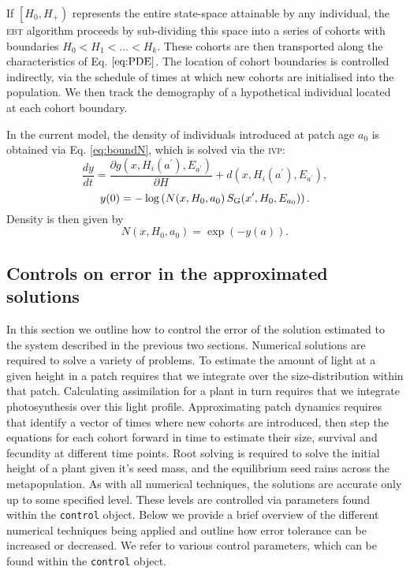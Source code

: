 \documentclass[10pt,twoside]{article}
\begin{document}
If \(\left[H_0, H_{ + } \right)\) represents the entire state-space
attainable by any individual, the \textsc{ebt} algorithm proceeds by sub-dividing
this space into a series of cohorts with boundaries
\(H_0 < H_1 < \ldots < H_k\). These cohorts are then transported along
the characteristics of Eq. \(\ref{eq:PDE}\). The location of cohort
boundaries is controlled indirectly, via the schedule of times at which
new cohorts are initialised into the population. We then track the
demography of a hypothetical individual located at each cohort boundary.

In the current model, the density of individuals introduced at patch age
\(a_0\) is obtained via Eq.
\ref{eq:boundN}, which is solved via the \textsc{ivp}:
\[\frac{dy}{dt} = \frac{\partial g(x, H_i(a^\prime), E_{a^\prime})}{\partial H} + d(x, H_i(a^\prime), E_{a^\prime}),\]
\[ y(0) = - \log\left(N(x, H_0 , a_0) \, S_{\rm G} (x^\prime, H_0, E_{a_0}) \right).\]
Density is then given by \[N(x, H_0 , a_0) = \exp( - y(a)).\]

\subsection{Controls on error in the approximated solutions}

In this section we outline how to control the error of the solution
estimated to the system described in the previous two sections.
Numerical solutions are required to solve a variety of problems. To
estimate the amount of light at a given height in a patch requires that
we integrate over the size-distribution within that patch. Calculating
assimilation for a plant in turn requires that we integrate
photosynthesis over this light profile. Approximating patch dynamics
requires that identify a vector of times where new cohorts are
introduced, then step the equations for each cohort forward in time to
estimate their size, survival and fecundity at different time points.
Root solving is required to solve the initial height of a plant given
it's seed mass, and the equilibrium seed rains across the
metapopulation. As with all numerical techniques, the solutions are
accurate only up to some specified level. These levels are controlled
via parameters found within the \texttt{control} object. Below we
provide a brief overview of the different numerical techniques being
applied and outline how error tolerance can be increased or decreased.
We refer to various control parameters, which can be found within the
\texttt{control} object.
\end{document}
